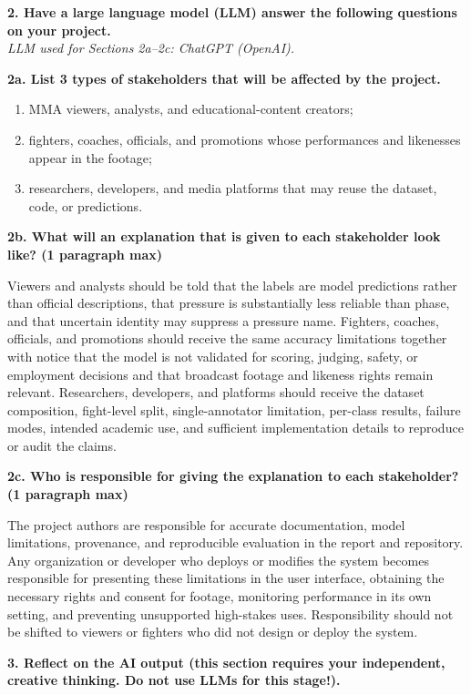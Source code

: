 \documentclass[10pt,twocolumn]{article}
\begin{document}
\medskip
\noindent\textbf{2. Have a large language model (LLM) answer the following questions on your project.}\\
\textit{LLM used for Sections 2a--2c: ChatGPT (OpenAI).}

\smallskip
\noindent\textbf{2a. List 3 types of stakeholders that will be affected by the project.}
\begin{enumerate}[label=(\roman*)]
  \item MMA viewers, analysts, and educational-content creators;
  \item fighters, coaches, officials, and promotions whose performances and likenesses appear in the footage;
  \item researchers, developers, and media platforms that may reuse the dataset, code, or predictions.
\end{enumerate}

\noindent\textbf{2b. What will an explanation that is given to each stakeholder look like? (1 paragraph max)}

Viewers and analysts should be told that the labels are model predictions rather than official descriptions, that pressure is substantially less reliable than phase, and that uncertain identity may suppress a pressure name. Fighters, coaches, officials, and promotions should receive the same accuracy limitations together with notice that the model is not validated for scoring, judging, safety, or employment decisions and that broadcast footage and likeness rights remain relevant. Researchers, developers, and platforms should receive the dataset composition, fight-level split, single-annotator limitation, per-class results, failure modes, intended academic use, and sufficient implementation details to reproduce or audit the claims.

\smallskip
\noindent\textbf{2c. Who is responsible for giving the explanation to each stakeholder? (1 paragraph max)}

The project authors are responsible for accurate documentation, model limitations, provenance, and reproducible evaluation in the report and repository. Any organization or developer who deploys or modifies the system becomes responsible for presenting these limitations in the user interface, obtaining the necessary rights and consent for footage, monitoring performance in its own setting, and preventing unsupported high-stakes uses. Responsibility should not be shifted to viewers or fighters who did not design or deploy the system.

\medskip
{}
\noindent\textbf{3. Reflect on the AI output (this section requires your independent, creative thinking. Do not use LLMs for this stage!).}
\end{document}
